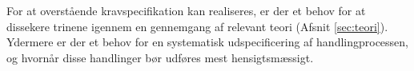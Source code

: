 For at overstående kravspecifikation kan realiseres, er der et behov for at dissekere trinene igennem en gennemgang af relevant teori (Afsnit \ref{sec:teori}). Ydermere er der et behov for en systematisk udspecificering af handlingprocessen, og hvornår disse handlinger bør udføres mest hensigtsmæssigt. \\





